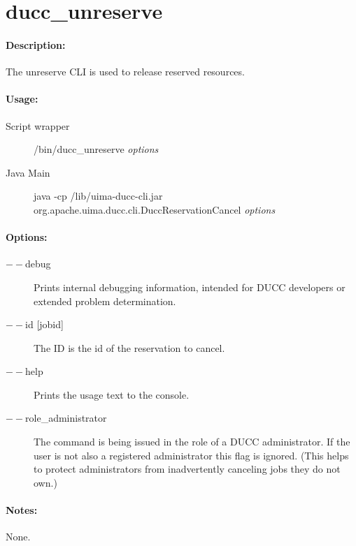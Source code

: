 % 
% 
% 
% 
\ifpdf
\else
{}
\fi
    \section{ducc\_unreserve}
    \label{sec:cli.unreserve}

    \paragraph{Description:}
    The unreserve CLI is used to release reserved resources. 

    \paragraph{Usage:}
    \begin{description}
    \item[Script wrapper] \ducchome/bin/ducc\_unreserve {\em options}
    \item[Java Main]      java -cp \ducchome/lib/uima-ducc-cli.jar org.apache.uima.ducc.cli.DuccReservationCancel {\em options}
    \end{description}

    \paragraph{Options:}
    \begin{description}
        \item[$--$debug ]          
          Prints internal debugging information, intended for DUCC developers or extended problem determination.
        \item[$--$id {[jobid]}]
          The ID is the id of the reservation to cancel.
        \item[$--$help]
          Prints the usage text to the console. 
        \item[$--$role\_administrator] The command is being issued in the role of a DUCC administrator.
          If the user is not also a registered administrator this flag is ignored.  (This helps to
          protect administrators from inadvertently canceling jobs they do not own.)          
     \end{description}
        
    \paragraph{Notes:}
    None.

